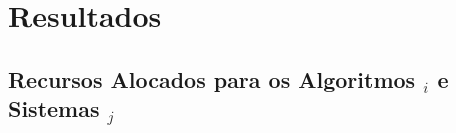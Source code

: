         
\section{Resultados}   \label{chap:results}
    
    \subsection{Recursos Alocados para os Algoritmos \A$_{i}$ e Sistemas \Ss$_{j}$}
        
